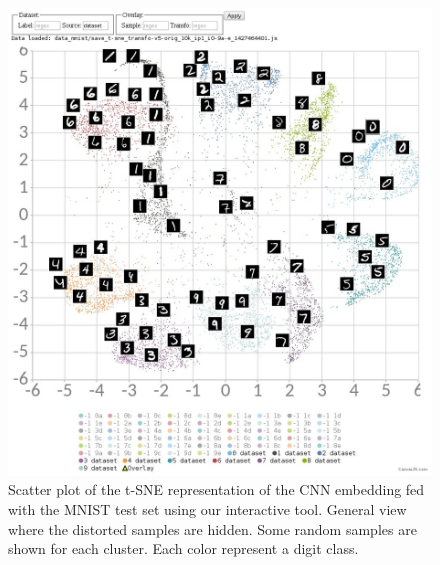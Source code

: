 \documentclass[a4paper,12pt]{report}
\begin{document}
\begin{figure}[t]
    \centering
    \includegraphics[width=\textwidth]{thesis_figures/mnist_nda_tsne.jpg}
    \caption{Scatter plot of the t-SNE representation of the CNN embedding fed with the MNIST test set using our interactive tool. General view where the distorted samples are hidden. Some random samples are shown for each cluster. Each color represent a digit class.}
    \label{fig:mnist_nda_tsne}
\end{figure}
\end{document}
